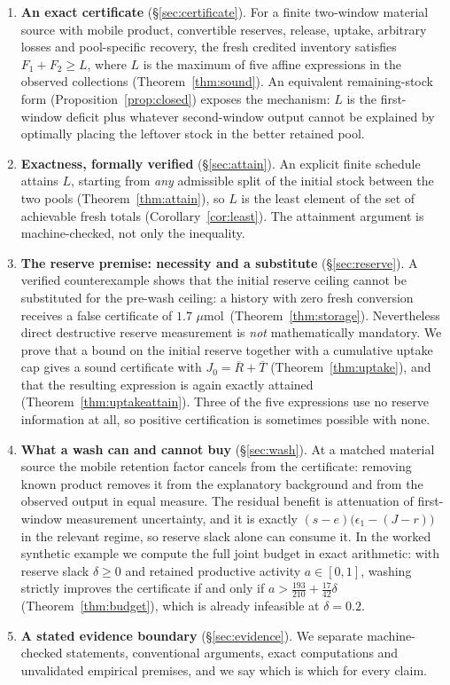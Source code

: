 \documentclass[11pt]{article}
\theoremstyle{plain}
\theoremstyle{definition}
\theoremstyle{remark}
\newcommand{\mumol}{\ensuremath{\mu\mathrm{mol}}}
\newcommand{\Lc}{L}
\begin{document}
\begin{enumerate}
\item \textbf{An exact certificate} (\S\ref{sec:certificate}). For a finite
two-window material source with mobile product, convertible reserves,
release, uptake, arbitrary losses and pool-specific recovery, the fresh
credited inventory satisfies $F_1+F_2\ge \Lc$, where $\Lc$ is the maximum of
five affine expressions in the observed collections
(Theorem~\ref{thm:sound}). An equivalent remaining-stock form
(Proposition~\ref{prop:closed}) exposes the mechanism: $\Lc$ is the
first-window deficit plus whatever second-window output cannot be explained
by optimally placing the leftover stock in the better retained pool.

\item \textbf{Exactness, formally verified} (\S\ref{sec:attain}). An explicit
finite schedule attains $\Lc$, starting from \emph{any} admissible split of
the initial stock between the two pools (Theorem~\ref{thm:attain}), so $\Lc$
is the least element of the set of achievable fresh totals
(Corollary~\ref{cor:least}). The attainment argument is machine-checked, not
only the inequality.

\item \textbf{The reserve premise: necessity and a substitute}
(\S\ref{sec:reserve}). A verified counterexample shows that the initial
reserve ceiling cannot be substituted for the pre-wash ceiling: a history
with zero fresh conversion receives a false certificate of $1.7$ \mumol\
(Theorem~\ref{thm:storage}). Nevertheless direct destructive reserve
measurement is \emph{not} mathematically mandatory. We prove that a bound on
the initial reserve together with a cumulative uptake cap gives a sound
certificate with $J_0=\overline R+\overline T$ (Theorem~\ref{thm:uptake}),
and that the resulting expression is again exactly attained
(Theorem~\ref{thm:uptakeattain}). Three of the five expressions use no
reserve information at all, so positive certification is sometimes possible
with none.

\item \textbf{What a wash can and cannot buy} (\S\ref{sec:wash}). At a matched
material source the mobile retention factor cancels from the certificate:
removing known product removes it from the explanatory background and from
the observed output in equal measure. The residual benefit is attenuation of
first-window measurement uncertainty, and it is exactly
$(s-e)\bigl(\epsilon_1-(J-r)\bigr)$ in the relevant regime, so reserve slack
alone can consume it. In the worked synthetic example we compute the full
joint budget in exact arithmetic: with reserve slack $\delta\ge0$ and
retained productive activity $a\in[0,1]$, washing strictly improves the
certificate if and only if $a>\tfrac{193}{210}+\tfrac{17}{42}\delta$
(Theorem~\ref{thm:budget}), which is already infeasible at $\delta=0.2$.

\item \textbf{A stated evidence boundary} (\S\ref{sec:evidence}). We separate
machine-checked statements, conventional arguments, exact computations and
unvalidated empirical premises, and we say which is which for every claim.
\end{enumerate}
\end{document}
